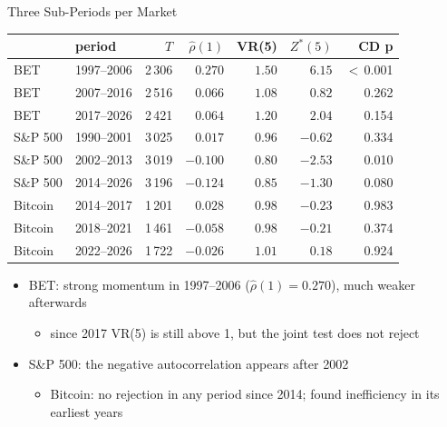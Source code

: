 \begin{frame}{Three Sub-Periods per Market}
\itemsize{\footnotesize}
\begin{center}
\scriptsize
\begin{tabular}{llrrrrr}
\toprule
& period & $T$ & $\hat\rho(1)$ & VR(5) & $Z^*(5)$ & CD p \\
\midrule
BET & 1997--2006 & 2\,306 & ${0.270}$ & $1.50$ & ${6.15}$ & $<$\,0.001 \\
BET & 2007--2016 & 2\,516 & ${0.066}$ & $1.08$ & ${0.82}$ & 0.262 \\
BET & 2017--2026 & 2\,421 & ${0.064}$ & $1.20$ & ${2.04}$ & 0.154 \\
S\&P 500 & 1990--2001 & 3\,025 & ${0.017}$ & $0.96$ & ${-0.62}$ & 0.334 \\
S\&P 500 & 2002--2013 & 3\,019 & ${-0.100}$ & $0.80$ & ${-2.53}$ & 0.010 \\
S\&P 500 & 2014--2026 & 3\,196 & ${-0.124}$ & $0.85$ & ${-1.30}$ & 0.080 \\
Bitcoin & 2014--2017 & 1\,201 & ${0.028}$ & $0.98$ & ${-0.23}$ & 0.983 \\
Bitcoin & 2018--2021 & 1\,461 & ${-0.058}$ & $0.98$ & ${-0.21}$ & 0.374 \\
Bitcoin & 2022--2026 & 1\,722 & ${-0.026}$ & $1.01$ & ${0.18}$ & 0.924 \\
\bottomrule
\end{tabular}
\end{center}
\begin{itemize}
    \item BET: strong momentum in 1997--2006 ($\hat\rho(1) = 0.270$), much weaker afterwards
    \begin{itemize}
        \item since 2017 VR(5) is still above 1, but the joint test does not reject
    \end{itemize}
    \item S\&P 500: the negative autocorrelation appears after 2002
    \begin{itemize}
        \item Bitcoin: no rejection in any period since 2014;  found inefficiency in its earliest years
    \end{itemize}
\end{itemize}
\end{frame}

